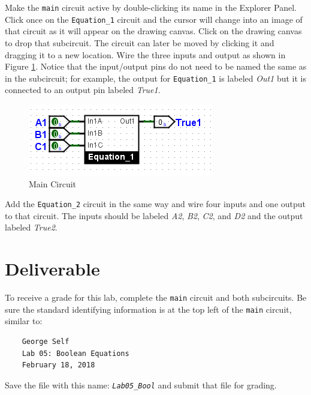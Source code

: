 Make the \lstinline[columns=fixed]|main| circuit active by double-clicking its name in the Explorer Panel. Click once on the \lstinline[columns=fixed]|Equation_1| circuit and the cursor will change into an image of that circuit as it will appear on the drawing canvas. Click on the drawing canvas to drop that subcircuit. The circuit can later be moved by clicking it and dragging it to a new location. Wire the three inputs and output as shown in Figure \ref{fig:bool-05}. Notice that the input/output pins do not need to be named the same as in the subcircuit; for example, the output for \lstinline[columns=fixed]|Equation_1| is labeled \textit{Out1} but it is connected to an output pin labeled \textit{True1}.

\begin{figure}[H]
	\centering
	\includegraphics[width=\maxwidth{.95\linewidth}]{gfx/bool-05}
	\caption{Main Circuit}
	\label{fig:bool-05}
\end{figure}

Add the \lstinline[columns=fixed]|Equation_2| circuit in the same way and wire four inputs and one output to that circuit. The inputs should be labeled \textit{A2}, \textit{B2}, \textit{C2}, and \textit{D2} and the output labeled \textit{True2}.


\section{Deliverable}

To receive a grade for this lab, complete the \lstinline[columns=fixed]|main| circuit and both subcircuits. Be sure the standard identifying information is at the top left of the \lstinline[columns=fixed]|main| circuit, similar to: 

\bigskip
\begin{minipage}{\linewidth}
	\begin{verbatim}
	George Self
	Lab 05: Boolean Equations
	February 18, 2018
	\end{verbatim}
\end{minipage}
\bigskip

Save the file with this name: \emph{\texttt{Lab05\_Bool}} and submit that file for grading.

